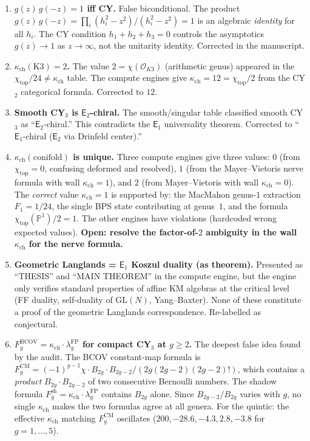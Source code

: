 \documentclass[11pt]{article}
\newcommand{\cO}{\mathcal{O}}
\newcommand{\bP}{\mathbb{P}}
\newcommand{\Eone}{\mathsf{E}_1}
\newcommand{\Etwo}{\mathsf{E}_2}
\begin{document}
\begin{enumerate}[label=\textbf{F\arabic*.}]
\item \textbf{$g(z)\,g(-z) = 1$ iff CY.} False biconditional. The product
 $g(z)\,g(-z) = \prod_i (h_i^2 - z^2)/(h_i^2 - z^2) = 1$ is an algebraic \emph{identity}
 for all $h_i$. The CY condition $h_1 + h_2 + h_3 = 0$ controls the asymptotics
 $g(z) \to 1$ as $z \to \infty$, not the unitarity identity. Corrected in the manuscript.

\item \textbf{$\kappa_{\mathrm{ch}}(\mathrm{K3}) = 2$.} The value $2 = \chi(\cO_{K3})$ (arithmetic genus) appeared
 in the $\chi_{\mathrm{top}}/24 \neq \kappa_{\mathrm{ch}}$ table. The compute engines give $\kappa_{\mathrm{ch}} = 12 = \chi_{\mathrm{top}}/2$
 from the CY$_2$ categorical formula. Corrected to $12$.

\item \textbf{Smooth CY$_3$ is $\Etwo$-chiral.} The smooth/singular table classified smooth CY$_3$
 as ``$\Etwo$-chiral.'' This contradicts the $\Eone$ universality theorem. Corrected to
 ``$\Eone$-chiral ($\Etwo$ via Drinfeld center).''

\item \textbf{$\kappa_{\mathrm{ch}}(\mathrm{conifold})$ is unique.} Three compute engines give three values: $0$
 (from $\chi_{\mathrm{top}} = 0$, confusing deformed and resolved), $1$ (from the Mayer--Vietoris nerve
 formula with wall $\kappa_{\mathrm{ch}} = 1$), and $2$ (from Mayer--Vietoris with wall $\kappa_{\mathrm{ch}} = 0$). The
 \emph{correct} value $\kappa_{\mathrm{ch}} = 1$ is supported by: the MacMahon genus-$1$ extraction $F_1 = 1/24$,
 the single BPS state contributing at genus~$1$, and the formula $\chi_{\mathrm{top}}(\bP^1)/2 = 1$.
 The other engines have violations (hardcoded wrong expected values).
 \textbf{Open: resolve the factor-of-$2$ ambiguity in the wall $\kappa_{\mathrm{ch}}$ for the nerve formula.}

\item \textbf{Geometric Langlands = $\Eone$ Koszul duality (as theorem).} Presented as ``THESIS'' and
 ``MAIN THEOREM'' in the compute engine, but the engine only verifies standard properties of
 affine KM algebras at the critical level (FF duality, self-duality of $\mathrm{GL}(N)$, Yang--Baxter).
 None of these constitute a proof of the geometric Langlands correspondence.
 Re-labelled as conjectural.

\item \textbf{$F_g^{\mathrm{BCOV}} = \kappa_{\mathrm{ch}} \cdot \lambda_g^{\mathrm{FP}}$ for compact CY$_3$ at $g \geq 2$.}
 The deepest false idea found by the audit. The BCOV constant-map formula is
 $F_g^{\mathrm{CM}} = (-1)^{g-1} \chi \cdot B_{2g} \cdot B_{2g-2} / (2g(2g-2)(2g-2)!)$,
 which contains a \emph{product} $B_{2g} \cdot B_{2g-2}$ of two consecutive Bernoulli numbers.
 The shadow formula $F_g^{\mathrm{sh}} = \kappa_{\mathrm{ch}} \cdot \lambda_g^{\mathrm{FP}}$ contains $B_{2g}$
 alone. Since $B_{2g-2}/B_{2g}$ varies with $g$, no single $\kappa_{\mathrm{ch}}$ makes the two formulas agree
 at all genera. For the quintic: the effective $\kappa_{\mathrm{ch}}$ matching $F_g^{\mathrm{CM}}$ oscillates
 ($200, -28.6, -4.3, 2.8, -3.8$ for $g = 1, \ldots, 5$).


\end{enumerate}
\end{document}
